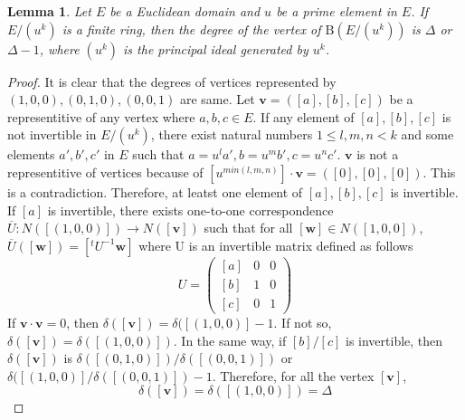 \documentclass{article}
\newtheorem{Lem}{Lemma}
\newtheorem{Cor}[Lem]{Corollary}
\newcommand{\B}{\mathrm{B}}
\begin{document}
\iffalse

\begin{Lem}
Let $R_1, R_2$ be rings with unit. 
\[ \B(R_1 \times R_2) \simeq \B(R_1) \otimes \B(R_2) \]
\end{Lem}

\begin{Cor}
The followig equations hold.
\begin{enumerate}
\item $ | \B(R_1 \times R_2) | = | \B(R_1) | \times | \B(R_2) | $
\item $ \Delta(\B(R_1 \times R_2)) = \Delta(\B(R_1)) \times \Delta( \B(R_2) )$
\end{enumerate}
\end{Cor}

\fi 

\begin{Lem}\label{Lem:regular}
Let $E$ be a Euclidean domain and $u$ be a prime element in $E$. 
If $E/(u^k)$ is a finite ring, then the degree of the vertex of $\B(E/(u^k))$ is $\Delta$ or $\Delta-1$, 
where $(u^k)$ is the principal ideal generated by $u^k$. 
\end{Lem}

\begin{proof}
It is clear that the degrees of vertices represented by $(1,0,0), (0,1,0), (0,0,1)$ are same.
Let ${\bm v} = ([a],[b],[c])$ be a representitive of any vertex where $a,b,c \in E$. 
If any element of $[a],[b],[c]$ is not invertible in $E/(u^k)$, 
there exist natural numbers $1 \leq l,m,n < k$ and some elements $a',b',c'$ in $E$ such that $a=u^l a', b=u^m b', c=u^n c'$. ${\bm v}$ is not a representitive of vertices because of $[u^{min(l,m,n)}] \cdot {\bm v} = ([0],[0],[0])$. 
This is a contradiction.
Therefore, at leatst one element of $[a],[b],[c]$ is invertible.
If $[a]$ is invertible, there exists one-to-one correspondence $\overline{U}: N([(1,0,0)])  \rightarrow N([{\bm v}])$ such that for all $[{\bm w}] \in N([1,0,0])$, $\overline{U}([\bm w]) = [ {}^t\!U^{-1} {\bm w} ]$ where U is an invertible matrix defined as follows
\[
 U = \left(
 \begin{matrix}
  [a] & 0 & 0 \\
  [b] & 1 & 0 \\
  [c] & 0 & 1
 \end{matrix} \right)
\]
If ${\bm v} \cdot {\bm v} = 0$, then $\delta([\bm v]) = \delta([(1,0,0)] - 1$. If not so, $\delta([\bm v]) = \delta([(1,0,0)])$.
In the same way, if $[b]/[c]$ is invertible, then $\delta([\bm v])$ is $\delta([(0,1,0)])/\delta([(0,0,1)])$ or $\delta([(1,0,0)]/\delta([(0,0,1)]) - 1$.
Therefore, for all the vertex $[{\bm v}]$, 
\[ \delta([\bm v]) = \delta([(1,0,0)]) = \Delta \]

\end{proof}
\end{document}
